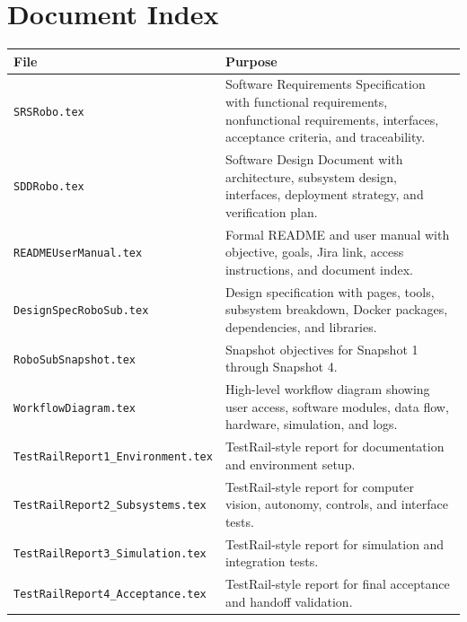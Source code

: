 \documentclass[12pt]{article}
\begin{document}
\section{Document Index}
\begin{longtable}{|p{}|p{}|}
\hline
\textbf{File} & \textbf{Purpose} \\
\hline
\texttt{SRSRobo.tex} & Software Requirements Specification with functional requirements, nonfunctional requirements, interfaces, acceptance criteria, and traceability. \\
\hline
\texttt{SDDRobo.tex} & Software Design Document with architecture, subsystem design, interfaces, deployment strategy, and verification plan. \\
\hline
\texttt{READMEUserManual.tex} & Formal README and user manual with objective, goals, Jira link, access instructions, and document index. \\
\hline
\texttt{DesignSpecRoboSub.tex} & Design specification with pages, tools, subsystem breakdown, Docker packages, dependencies, and libraries. \\
\hline
\texttt{RoboSubSnapshot.tex} & Snapshot objectives for Snapshot 1 through Snapshot 4. \\
\hline
\texttt{WorkflowDiagram.tex} & High-level workflow diagram showing user access, software modules, data flow, hardware, simulation, and logs. \\
\hline
\texttt{TestRailReport1\_Environment.tex} & TestRail-style report for documentation and environment setup. \\
\hline
\texttt{TestRailReport2\_Subsystems.tex} & TestRail-style report for computer vision, autonomy, controls, and interface tests. \\
\hline
\texttt{TestRailReport3\_Simulation.tex} & TestRail-style report for simulation and integration tests. \\
\hline
\texttt{TestRailReport4\_Acceptance.tex} & TestRail-style report for final acceptance and handoff validation. \\
\hline
\end{longtable}
\end{document}
